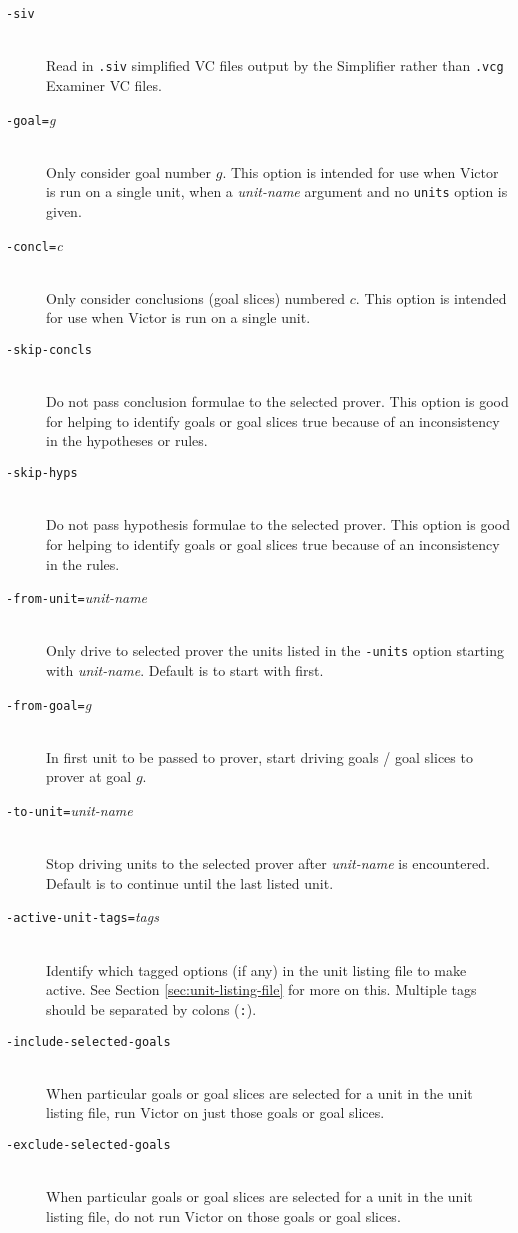\documentclass[12pt,fleqn]{article}
\newcommand{\csv}{\textsc{vct}}
\newcommand{\optionb}[1]{\item[\texttt{-{#1}}]\ \\}
\newcommand{\optionv}[2]{\item[\texttt{-{#1}=}\mdseries\textit{#2}]\ \\}
\begin{document}
\begin{description}
  \optionb{siv} Read in \texttt{.siv} simplified VC files output by the
     Simplifier rather than \texttt{.vcg} Examiner VC files.

\optionv{goal}{g} Only consider goal number $g$.
  This option is intended for use when Victor is run on a single unit,
  when a \textit{unit-name} argument and no \texttt{units} option is
  given.

\optionv{concl}{c} Only consider conclusions (goal slices) numbered $c$.  
  This option is intended for use when Victor is run on a single unit.

\optionb{skip-concls}
  Do not pass conclusion formulae to the selected prover.  This option is
  good for helping to identify goals or goal slices true because of an
  inconsistency in the hypotheses or rules.

\optionb{skip-hyps}
  Do not pass hypothesis formulae to the selected prover.  This option is
  good for helping to identify goals or goal slices true because of an
  inconsistency in the rules.

\optionv{from-unit}{unit-name}
  Only drive to selected prover the units listed in the \texttt{-units} option
  starting with \textit{unit-name}.  Default is to start with first. 

\optionv{from-goal}{g}
  In first unit to be passed to prover, start driving goals / goal
  slices to prover at goal $g$.

\optionv{to-unit}{unit-name}
  Stop driving units to the selected prover after \textit{unit-name} is 
  encountered. Default is to continue until the last listed unit.

\optionv{active-unit-tags}{tags}
  Identify which tagged options (if any) in the unit listing file to make
  active.  See Section \ref{sec:unit-listing-file} for more on this.
  Multiple tags should be separated by colons (\texttt{:}).

\optionb{include-selected-goals}
  When particular goals or goal slices are selected for a unit in the
  unit listing file, run Victor on just those goals or goal slices.

\optionb{exclude-selected-goals}
  When particular goals or goal slices are selected for a unit in the
  unit listing file, do not run Victor on those goals or goal slices.

\end{description}
\end{document}
